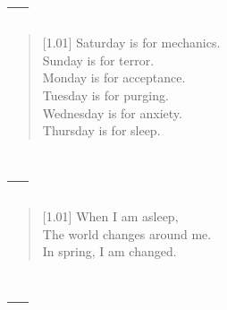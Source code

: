 \subsection{---}

\begin{verse}[1.01\textwidth]
Saturday is for mechanics.\\
Sunday is for terror.\\
Monday is for acceptance.\\
Tuesday is for purging.\\
Wednesday is for anxiety.\\
Thursday is for sleep.
\end{verse}

\newpage
\null
\vspace{1cm}
\subsection{---}

\begin{verse}[1.01\textwidth]
When I am asleep,\\
The world changes around me.\\
In spring, I am changed.
\end{verse}

\newpage
\subsection{---}

